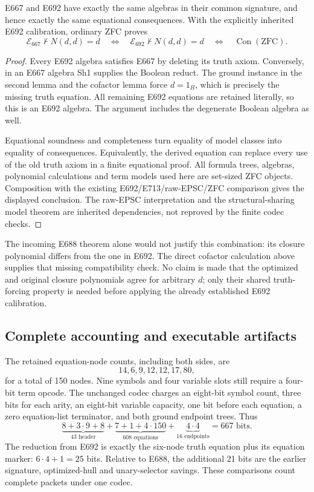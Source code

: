 \begin{theorem}
\label{thm:e667-equivalence}
E667 and E692 have exactly the same algebras in their common signature,
and hence exactly the same equational consequences. With the explicitly
inherited E692 calibration, ordinary ZFC proves
\[
 \mathcal E_{667}\nvdash N(d,d)=d
 \quad\Longleftrightarrow\quad
 \mathcal E_{692}\nvdash N(d,d)=d
 \quad\Longleftrightarrow\quad
 \operatorname{Con}(\mathrm{ZFC}).
\]
\end{theorem}
\begin{proof}
Every E692 algebra satisfies E667 by deleting its truth axiom.
Conversely, in an E667 algebra Sh1 supplies the Boolean reduct. The
ground instance in the second lemma and the cofactor lemma force
$d=1_B$, which is precisely the missing truth equation. All remaining
E692 equations are retained literally, so this is an E692 algebra.
The argument includes the degenerate Boolean algebra as well.

Equational soundness and completeness turn equality of model classes
into equality of consequences. Equivalently, the derived equation can
replace every use of the old truth axiom in a finite equational proof.
All formula trees, algebras, polynomial calculations and term models
used here are set-sized ZFC objects. Composition with the existing
E692/E713/raw-EPSC/ZFC comparison gives the displayed conclusion.
The raw-EPSC interpretation and the structural-sharing model theorem
are inherited dependencies, not reproved by the finite codec checks.
\end{proof}

The incoming E688 theorem alone would not justify this combination:
its closure polynomial differs from the one in E692. The direct
cofactor calculation above supplies that missing compatibility check.
No claim is made that the optimized and original closure polynomials
agree for arbitrary $d$; only their shared truth-forcing property is
needed before applying the already established E692 calibration.

\subsection{Complete accounting and executable artifacts}

The retained equation-node counts, including both sides, are
\[
                     14,6,9,12,12,17,80,
\]
for a total of 150 nodes. Nine symbols and four variable slots still
require a four-bit term opcode. The unchanged codec charges an
eight-bit symbol count, three bits for each arity, an eight-bit variable
capacity, one bit before each equation, a zero equation-list terminator,
and both ground endpoint trees. Thus
\[
 \underbrace{8+3\cdot9+8}_{43\text{ header}}
 +\underbrace{7+1+4\cdot150}_{608\text{ equations}}
 +\underbrace{4\cdot4}_{16\text{ endpoints}}
 =\boxed{667\text{ bits}}.
\]
The reduction from E692 is exactly the six-node truth equation plus its
equation marker: $6\cdot4+1=25$ bits. Relative to E688, the additional
21 bits are the earlier signature, optimized-hull and unary-selector
savings. These comparisons count complete packets under one codec.

